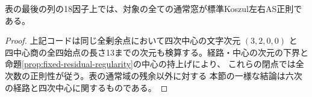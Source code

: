 \begin{corollary}
表の最後の列の18因子上では、対象の全ての通常窓が標準Koszul左右AS正則である。
\end{corollary}
\begin{proof}
上記コードは同じ全剰余点において四次中心の文字次元 $(3,2,0,0)$ と
四中心商の全四始点の長さ13までの次元も検算する。経路・中心の次元の下界と
命題\ref{prop:fixed-residual-regularity}の中心の持上げにより、
これらの閉点では全次数の正則性が従う。表の通常域の残余以外に対する
本節の一様な結論は六次の経路と四次中心に関するものである。
\end{proof}
